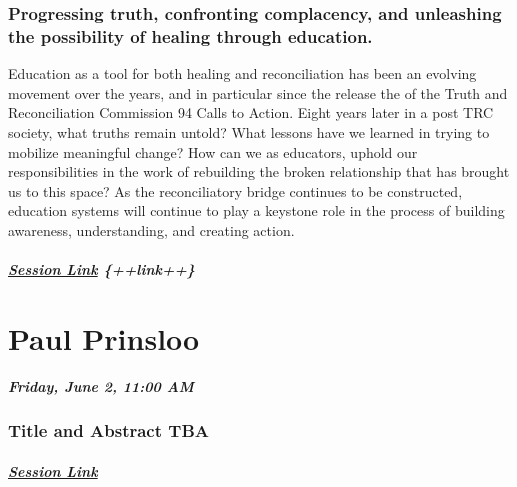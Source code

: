 \documentclass[
]{book}
\begin{document}
\begin{keynote}
\hypertarget{progressing-truth-confronting-complacency-and-unleashing-the-possibility-of-healing-through-education.}{%
\subsubsection*{Progressing truth, confronting complacency, and
unleashing the possibility of healing through
education.}\label{progressing-truth-confronting-complacency-and-unleashing-the-possibility-of-healing-through-education.}}

Education as a tool for both healing and reconciliation has been an
evolving movement over the years, and in particular since the release
the of the Truth and Reconciliation Commission 94 Calls to Action. Eight
years later in a post TRC society, what truths remain untold? What
lessons have we learned in trying to mobilize meaningful change? How can
we as educators, uphold our responsibilities in the work of rebuilding
the broken relationship that has brought us to this space? As the
reconciliatory bridge continues to be constructed, education systems
will continue to play a keystone role in the process of building
awareness, understanding, and creating action.

\hypertarget{session-link-link}{%
\subparagraph{\texorpdfstring{\href{}{Session Link}
\{++link++\}}{Session Link \{++link++\}}}\label{session-link-link}}
\end{keynote}

\hypertarget{paul-prinsloo}{%
\section*{Paul Prinsloo}\label{paul-prinsloo}}

\textbf{\emph{Friday, June 2, 11:00 AM}}

\begin{keynote}
\hypertarget{title-and-abstract-tba}{%
\subsubsection{Title and Abstract TBA}\label{title-and-abstract-tba}}

\hypertarget{session-link}{%
\subparagraph{\texorpdfstring{\href{}{Session
Link}}{Session Link}}\label{session-link}}
\end{keynote}
\end{document}
